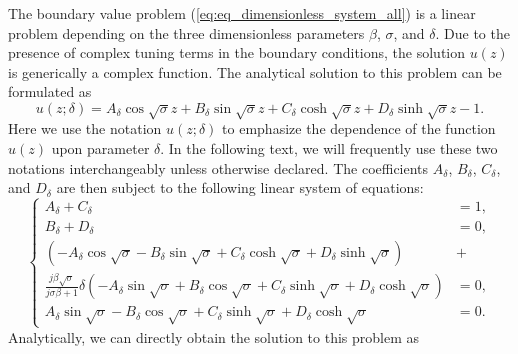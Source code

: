 \documentclass{article}
\begin{document}
The boundary value problem (\ref{eq:eq_dimensionless_system_all}) is a linear problem depending on the three dimensionless parameters $\beta$, $\sigma$, and $\delta$. Due to the presence of complex tuning terms in the boundary conditions, the solution $u(z)$ is generically a complex function. The analytical solution to this problem can be formulated as
\begin{equation}
    u(z;\delta) = A_\delta \cos{\sqrt{\sigma}z} + B_\delta \sin{\sqrt{\sigma}z} + C_\delta \cosh{\sqrt{\sigma}z} + D_\delta \sinh{\sqrt{\sigma}z} - 1.
    \label{eq:eq_disp_func_general_coeffs}
\end{equation}
Here we use the notation $u(z;\delta)$ to emphasize the dependence of the function $u(z)$ upon parameter $\delta$. In the following text, we will frequently use these two notations interchangeably unless otherwise declared. The coefficients $A_\delta$, $B_\delta$, $C_\delta$, and $D_\delta$ are then subject to the following linear system of equations:
\begin{equation}
    \left\{\begin{aligned}
        A_\delta + C_\delta &= 1, \\
        B_\delta + D_\delta &= 0, \\
        \left( - A_\delta \cos{\sqrt{\sigma}} - B_\delta \sin{\sqrt{\sigma}} + C_\delta \cosh{\sqrt{\sigma}} + D_\delta \sinh{\sqrt{\sigma}} \right) &+ \\
        \frac{j \beta \sqrt{\sigma}}{ j\sigma \beta + 1 } \delta \left( - A_\delta \sin{\sqrt{\sigma}} + B_\delta \cos{\sqrt{\sigma}} + C_\delta \sinh{\sqrt{\sigma}} + D_\delta \cosh{\sqrt{\sigma}} \right) &= 0, \\
        A_\delta \sin{\sqrt{\sigma}} - B_\delta \cos{\sqrt{\sigma}} + C_\delta \sinh{\sqrt{\sigma}} + D_\delta \cosh{\sqrt{\sigma}} &= 0.
    \end{aligned}\right.
\end{equation}
Analytically, we can directly obtain the solution to this problem as 
\end{document}
